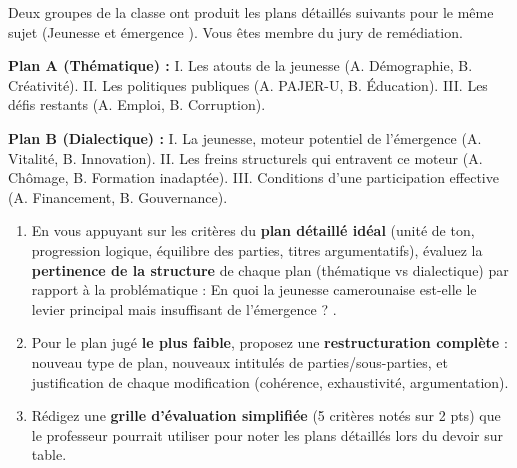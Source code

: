 \documentclass[11pt]{article}
\begin{document}
\begin{exercice}
\noindent Deux groupes de la classe ont produit les plans détaillés suivants pour le même sujet (\og Jeunesse et émergence \fg). Vous êtes membre du jury de remédiation.

\textbf{Plan A (Thématique) :} I. Les atouts de la jeunesse (A. Démographie, B. Créativité). II. Les politiques publiques (A. PAJER-U, B. Éducation). III. Les défis restants (A. Emploi, B. Corruption).

\textbf{Plan B (Dialectique) :} I. La jeunesse, moteur potentiel de l'émergence (A. Vitalité, B. Innovation). II. Les freins structurels qui entravent ce moteur (A. Chômage, B. Formation inadaptée). III. Conditions d'une participation effective (A. Financement, B. Gouvernance).

\begin{enumerate}
    \item En vous appuyant sur les critères du \textbf{plan détaillé idéal} (unité de ton, progression logique, équilibre des parties, titres argumentatifs), évaluez la \textbf{pertinence de la structure} de chaque plan (thématique vs dialectique) par rapport à la problématique : \og En quoi la jeunesse camerounaise est-elle le levier principal mais insuffisant de l'émergence ? \fg.
    \item Pour le plan jugé \textbf{le plus faible}, proposez une \textbf{restructuration complète} : nouveau type de plan, nouveaux intitulés de parties/sous-parties, et justification de chaque modification (cohérence, exhaustivité, argumentation).
    \item Rédigez une \textbf{grille d'évaluation simplifiée} (5 critères notés sur 2 pts) que le professeur pourrait utiliser pour noter les plans détaillés lors du devoir sur table.
\end{enumerate}
\end{exercice}
\end{document}
